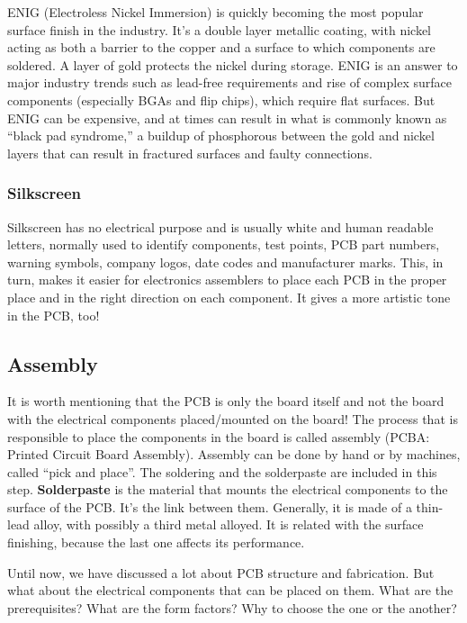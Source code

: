 \documentclass[final]{cubedoc}
\begin{document}
	ENIG (Electroless Nickel Immersion) is quickly becoming the most popular surface finish in the industry. It’s a double layer metallic coating, with nickel acting as both a barrier to the copper and a surface to which components are soldered. A layer of gold protects the nickel during storage. ENIG is an answer to major industry trends such as lead-free requirements and rise of complex surface components (especially BGAs and flip chips), which require flat surfaces. But ENIG can be expensive, and at times can result in what is commonly known as “black pad syndrome,” a buildup of phosphorous between the gold and nickel layers that can result in fractured surfaces and faulty connections. 
	
	
	\subsubsection{Silkscreen}
	
	Silkscreen has no electrical purpose and is usually white and human readable letters, normally used to identify components, test points, PCB part numbers, warning symbols, company logos, date codes and manufacturer marks. This, in turn, makes it easier for electronics assemblers to place each PCB in the proper place and in the right direction on each component. It gives a more artistic tone in the PCB, too!
	
	
	\subsection{Assembly}
	
	It is worth mentioning that the PCB is only the board itself and not the board with the electrical components placed/mounted on the board! The process that is responsible to place the components in the board is called assembly (PCBA: Printed Circuit Board Assembly). Assembly can be done by hand or by machines, called “pick and place”. The soldering and the solderpaste are included in this step. \textbf{Solderpaste} is the material that mounts the electrical components to the surface of the PCB. It’s the link between them. Generally, it is made of a thin-lead alloy, with possibly a third metal alloyed. It is related with the surface finishing, because the last one affects its performance.
	
	Until now, we have discussed a lot about PCB structure and fabrication. But what about the electrical components that can be placed on them. What are the prerequisites? What are the form factors? Why to choose the one or the another?
	
\end{document}
